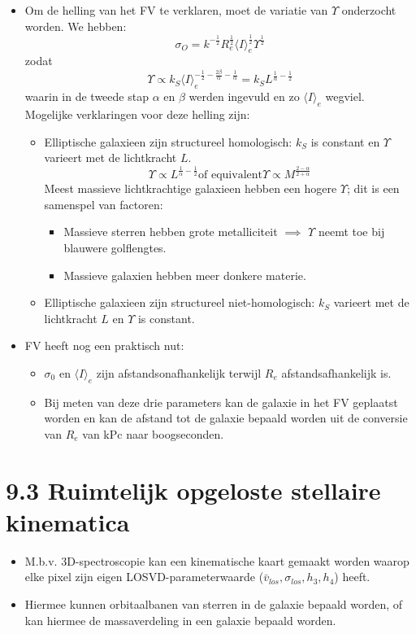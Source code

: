 \documentclass[10pt,a4paper]{article}
\begin{document}
\begin{itemize}
  \item Om de helling van het FV te verklaren, moet de variatie van $\Upsilon$ onderzocht worden. We hebben:
  \[
  \sigma_O=k^{-\frac{1}{2}}R_e^{\frac{1}{2}}\langle I\rangle_e^{\frac{1}{2}}\Upsilon^{\frac{1}{2}}
  \]
  zodat
  \[
  \Upsilon \propto k_S\langle I\rangle_e^{-\frac{1}{2}-\frac{2\beta}{\alpha}-\frac{1}{\alpha}}=k_SL^{\frac{1}{\alpha}-\frac{1}{2}}
  \]
  waarin in de tweede stap $\alpha$ en $\beta$ werden ingevuld en zo $\langle I\rangle_e$ wegviel. Mogelijke verklaringen voor deze helling zijn:
  \begin{itemize}
    \item Elliptische galaxieen zijn structureel homologisch: $k_S$ is constant en $\Upsilon$ varieert met de lichtkracht $L$.
    \[
    \Upsilon \propto L^{\frac{1}{\alpha}-\frac{1}{2}} \text{of equivalent} \Upsilon \propto M^{\frac{2-\alpha}{2+\alpha}}
    \]
    Meest massieve lichtkrachtige galaxieen hebben een hogere $\Upsilon$; dit is een samenspel van factoren:
    \begin{itemize}
      \item Massieve sterren hebben grote metalliciteit $\implies$ $\Upsilon$ neemt toe bij blauwere golflengtes.
      \item Massieve galaxien hebben meer donkere materie.
    \end{itemize}
    \item Elliptische galaxieen zijn structureel niet-homologisch: $k_S$ varieert met de lichtkracht $L$ en $\Upsilon$ is constant.
  \end{itemize}
  \item FV heeft nog een praktisch nut:
  \begin{itemize}
    \item $\sigma_0$ en $\langle I\rangle_e$ zijn afstandsonafhankelijk terwijl $R_e$ afstandsafhankelijk is.
    \item Bij meten van deze drie parameters kan de galaxie in het FV geplaatst worden en kan de afstand tot de galaxie bepaald worden uit de conversie van $R_e$ van kPc naar boogseconden.
  \end{itemize}
\end{itemize}
\section*{9.3 Ruimtelijk opgeloste stellaire kinematica}
\begin{itemize}
  \item M.b.v. 3D-spectroscopie kan een kinematische kaart gemaakt worden waarop elke pixel zijn eigen LOSVD-parameterwaarde ($\bar{v}_{los}, \sigma_{los}, h_3, h_4$) heeft.
  \item Hiermee kunnen orbitaalbanen van sterren in de galaxie bepaald worden, of kan hiermee de massaverdeling in een galaxie bepaald worden.
\end{itemize}
\end{document}
